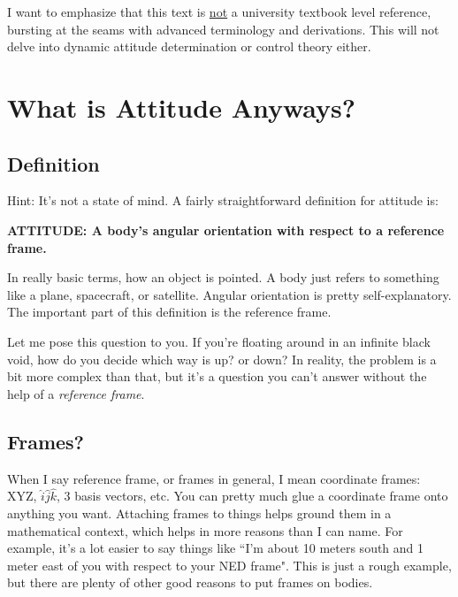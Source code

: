 \documentclass[a4paper,14pt]{extreport}
\begin{document}
I want to emphasize that this text is \underline{not} a university textbook level reference, bursting at the seams with advanced terminology and derivations. This will not delve into dynamic attitude determination or control theory either.

\chapter{What is Attitude Anyways?}

\section{Definition}
Hint: It's not a state of mind. A fairly straightforward definition for attitude is:

\begin{center}
\textbf{ATTITUDE: A body's angular orientation with respect to a reference frame.}
\end{center}

In really basic terms, how an object is pointed. A body just refers to something like a plane, spacecraft, or satellite. Angular orientation is pretty self-explanatory. The important part of this definition is the reference frame. 

Let me pose this question to you. If you're floating around in an infinite black void, how do you decide which way is up? or down? In reality, the problem is a bit more complex than that, but it's a question you can't answer without the help of a \textit{reference frame}.

\section{Frames?}

When I say reference frame, or frames in general, I mean coordinate frames: XYZ, \(\hat{i}\hat{j}\hat{k}\), 3 basis vectors, etc. You can pretty much glue a coordinate frame onto anything you want. Attaching frames to things helps ground them in a mathematical context, which helps in more reasons than I can name. For example, it's a lot easier to say things like ``I'm about 10 meters south and 1 meter east of you with respect to your NED frame". This is just a rough example, but there are plenty of other good reasons to put frames on bodies.
\end{document}
